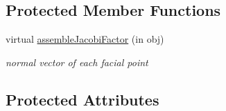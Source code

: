 \subsection*{Protected Member Functions}
\begin{DoxyCompactItemize}
\item 
virtual \hyperlink{class_ndg_mesh_a4a0b19580b622c53f9e336e7dbd533bd}{assemble\+Jacobi\+Factor} (in obj)
\begin{DoxyCompactList}\small\item\em normal vector of each facial point \end{DoxyCompactList}\end{DoxyCompactItemize}
\subsection*{Protected Attributes}
